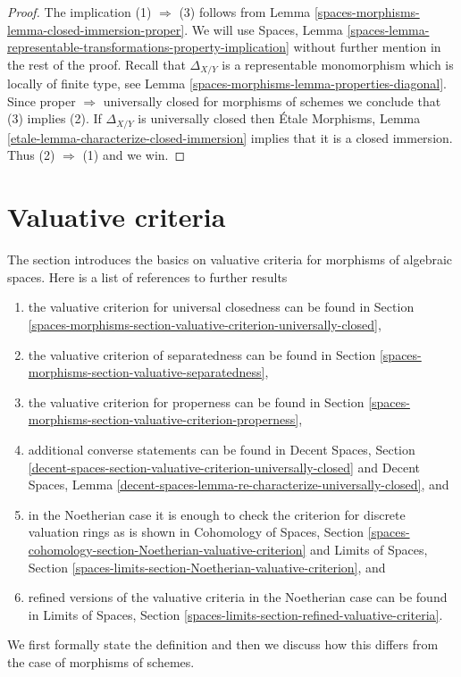 \begin{proof}
The implication (1) $\Rightarrow$ (3) follows from
Lemma \ref{spaces-morphisms-lemma-closed-immersion-proper}.
We will use
Spaces, Lemma
\ref{spaces-lemma-representable-transformations-property-implication}
without further mention in the rest of the proof.
Recall that $\Delta_{X/Y}$ is a representable
monomorphism which is locally of finite type, see
Lemma \ref{spaces-morphisms-lemma-properties-diagonal}.
Since proper $\Rightarrow$ universally closed for morphisms of schemes
we conclude that (3) implies (2).
If $\Delta_{X/Y}$ is universally closed then
\'Etale Morphisms,
Lemma \ref{etale-lemma-characterize-closed-immersion}
implies that it is a closed immersion. Thus (2) $\Rightarrow$ (1)
and we win.
\end{proof}

\section{Valuative criteria}
\label{spaces-morphisms-section-valuative}
The section introduces the basics on valuative criteria for morphisms
of algebraic spaces. Here is a list of references to further results
\begin{enumerate}
\item the valuative criterion for universal closedness can be found in
Section \ref{spaces-morphisms-section-valuative-criterion-universally-closed},
\item the valuative criterion of separatedness can be found in
Section \ref{spaces-morphisms-section-valuative-separatedness},
\item the valuative criterion for properness can be found in
Section \ref{spaces-morphisms-section-valuative-criterion-properness},
\item additional converse statements can be found in
Decent Spaces, Section
\ref{decent-spaces-section-valuative-criterion-universally-closed}
and Decent Spaces, Lemma
\ref{decent-spaces-lemma-re-characterize-universally-closed}, and
\item in the Noetherian case it is enough to check the criterion for
discrete valuation rings as is shown in Cohomology of Spaces, Section
\ref{spaces-cohomology-section-Noetherian-valuative-criterion} and
Limits of Spaces, Section
\ref{spaces-limits-section-Noetherian-valuative-criterion}, and
\item refined versions of the valuative criteria in the Noetherian
case can be found in Limits of Spaces, Section
\ref{spaces-limits-section-refined-valuative-criteria}.
\end{enumerate}
We first formally state the definition and then we discuss how this
differs from the case of morphisms of schemes.

